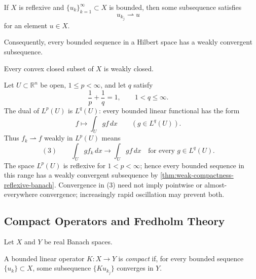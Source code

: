 \begin{theorem}
\label{thm:weak-compactness-reflexive-banach}

If $X$ is reflexive and $\{u_k\}_{k=1}^\infty\subset X$ is bounded, then some subsequence satisfies
\[
u_{k_j}\rightharpoonup u
\]
for an element $u\in X$.
\end{theorem}

Consequently, every bounded sequence in a Hilbert space has a weakly convergent subsequence.

\begin{theorem}
\label{thm:mazurs-theorem}

Every convex closed subset of $X$ is weakly closed.
\end{theorem}

\begin{example}
\label{ex:weak-convergence-lp-duality}

Let $U\subset\mathbb R^n$ be open, $1\leq p<\infty$, and let $q$ satisfy
\[
\frac1p+\frac1q=1,
\qquad 1<q\leq\infty.
\]
The dual of $L^p(U)$ is $L^q(U)$: every bounded linear functional has the form
\[
f\longmapsto\int_Ugf\,dx
\qquad(g\in L^q(U)).
\]
Thus $f_k\rightharpoonup f$ weakly in $L^p(U)$ means
\[
(3)\qquad
\int_Ugf_k\,dx\longrightarrow\int_Ugf\,dx
\quad\text{for every }g\in L^q(U).
\]
The space $L^p(U)$ is reflexive for $1<p<\infty$; hence every bounded sequence in this range has a weakly convergent subsequence by \cref{thm:weak-compactness-reflexive-banach}. Convergence in (3) need not imply pointwise or almost-everywhere convergence; increasingly rapid oscillation may prevent both.
\end{example}

\subsection{Compact Operators and Fredholm Theory}
\label{sec:compact-operators-fredholm-theory}

Let $X$ and $Y$ be real Banach spaces.

\begin{definition}
\label{def:compact-linear-operator}
A bounded linear operator $K:X\to Y$ is \textit{compact} if, for every bounded sequence $\{u_k\}\subset X$, some subsequence $\{Ku_{k_j}\}$ converges in $Y$.
\end{definition}

